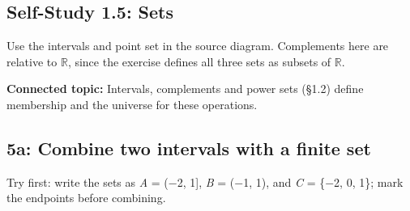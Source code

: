 \documentclass[11pt]{article}
\begin{document}
\begin{keepsection}
\section{Self-Study 1.5: Sets}

Use the intervals and point set in the source diagram. Complements here are relative to \ensuremath{\mathbb{R}}, since the exercise defines all three sets as subsets of \ensuremath{\mathbb{R}}.

\textbf{Connected topic:} Intervals, complements and power sets (§1.2) define membership and the universe for these operations.

\begin{keepsection}
\subsection{5a: Combine two intervals with a finite set}

Try first: write the sets as \textit{A} = (\ensuremath{-}2, 1], \textit{B} = (\ensuremath{-}1, 1), and \textit{C} = \{\ensuremath{-}2, 0, 1\}; mark the endpoints before combining.


\end{keepsection}
\end{keepsection}
\end{document}
